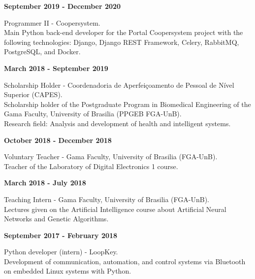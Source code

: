 \documentclass[11pt]{article}
\begin{document}
\textbf{September 2019 - December 2020}
\begin{addmargin}{0.5cm}
Programmer II - Coopersystem.\\
Main Python back-end developer for the Portal Coopersystem project with the following technologies: Django, Django REST Framework, Celery, RabbitMQ, PostgreSQL, and Docker.\\
\end{addmargin}


\textbf{March 2018 - September 2019}
\begin{addmargin}{0.5cm}
Scholarship Holder - Coordenadoria de Aperfeiçoamento de Pessoal de Nível Superior (CAPES). \\
Scholarship holder of the Postgraduate Program in Biomedical Engineering of the
Gama Faculty, University of Brasilia (PPGEB FGA-UnB).\\
Research field: Analysis and development of health and intelligent systems.\\
\end{addmargin}

\textbf{October 2018 - December 2018}
\begin{addmargin}{0.5cm}
Voluntary Teacher -  Gama Faculty, University of Brasilia (FGA-UnB).\\
Teacher of the Laboratory of Digital Electronics 1 course. \\
\end{addmargin}

\textbf{March 2018 - July 2018}
\begin{addmargin}{0.5cm}
Teaching Intern - Gama Faculty, University of Brasilia (FGA-UnB).\\
Lectures given on the Artificial Intelligence  course  about Artificial Neural Networks
and Genetic Algorithms. \\
\end{addmargin}

\textbf{September 2017 - February 2018}
\begin{addmargin}{0.5cm}
Python developer (intern) - LoopKey.\\
Development of communication, automation, and control systems via Bluetooth on
embedded Linux systems with Python. \\
\end{addmargin}
\end{document}
